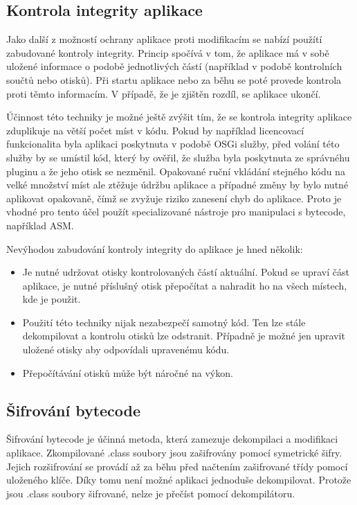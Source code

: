 \subsection{Kontrola integrity aplikace}

Jako další z možností ochrany aplikace proti modifikacím se nabízí použítí
zabudované kontroly integrity. Princip spočívá v tom, že aplikace má v sobě
uložené informace o podobě jednotlivých částí (například v podobě
kontrolních součtů nebo otisků). Při startu aplikace nebo za běhu se poté
provede kontrola proti těmto informacím. V případě, že je zjištěn rozdíl, se
aplikace ukončí.

Účinnost této techniky je možné ještě zvýšit tím, že se kontrola integrity
aplikace zduplikuje na větší počet míst v kódu. Pokud by například licencovací
funkcionalita byla aplikaci poskytnuta v podobě \gls{OSGi} služby, před volání
této služby by se umístil kód, který by ověřil, že služba byla poskytnuta ze
správnéhu pluginu a že jeho otisk se nezměnil. Opakované ruční vkládání stejného
kódu na velké množství míst ale ztěžuje údržbu aplikace a případné změny by bylo
nutné aplikovat opakovaně, čímž se zvyžuje riziko zanesení chyb do aplikace.
Proto je vhodné pro tento účel použít specializované nástroje pro manipulaci s
bytecode, například ASM\cite{asm}.

Nevýhodou zabudování kontroly integrity do aplikace je hned několik:
\begin{itemize}
  \item Je nutné udržovat otisky kontrolovaných částí aktuální. Pokud se upraví
  část aplikace, je nutné příslušný otisk přepočítat a nahradit ho na všech
  místech, kde je použit.
  \item Použití této techniky nijak nezabezpečí samotný kód. Ten lze stále
  dekompilovat a kontrolu otisků lze odstranit. Případně je možné jen upravit
  uložené otisky aby odpovídali upravenému kódu.
  \item Přepočítávání otisků může být náročné na výkon.
\end{itemize}


\subsection{Šifrování bytecode}

Šifrování bytecode je účinná metoda, která zamezuje dekompilaci a modifikaci
aplikace. Zkompilované .class soubory jsou zašifrovány pomocí symetrické šifry.
Jejich rozšifrování se provádí až za běhu před načtením zašifrované třídy pomocí
uloženého klíče. Díky tomu není možné aplikaci jednoduše dekompilovat. Protože
jsou .class soubory šifrované, nelze je přečíst pomocí dekompilátoru.

